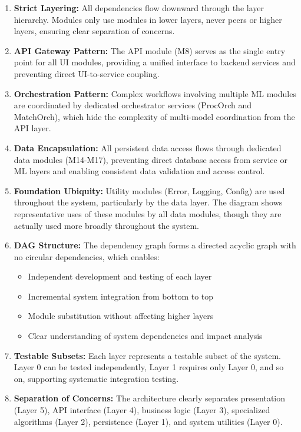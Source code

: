 \documentclass[12pt, titlepage]{article}
\begin{document}
\begin{enumerate}
\item \textbf{Strict Layering:} All dependencies flow downward through the layer hierarchy. Modules only use modules in lower layers, never peers or higher layers, ensuring clear separation of concerns.

\item \textbf{API Gateway Pattern:} The API module (M8) serves as the single entry point for all UI modules, providing a unified interface to backend services and preventing direct UI-to-service coupling.

\item \textbf{Orchestration Pattern:} Complex workflows involving multiple ML modules are coordinated by dedicated orchestrator services (ProcOrch and MatchOrch), which hide the complexity of multi-model coordination from the API layer.

\item \textbf{Data Encapsulation:} All persistent data access flows through dedicated data modules (M14-M17), preventing direct database access from service or ML layers and enabling consistent data validation and access control.

\item \textbf{Foundation Ubiquity:} Utility modules (Error, Logging, Config) are used throughout the system, particularly by the data layer. The diagram shows representative uses of these modules by all data modules, though they are actually used more broadly throughout the system.

\item \textbf{DAG Structure:} The dependency graph forms a directed acyclic graph with no circular dependencies, which enables:
  \begin{itemize}
  \item Independent development and testing of each layer
  \item Incremental system integration from bottom to top
  \item Module substitution without affecting higher layers
  \item Clear understanding of system dependencies and impact analysis
  \end{itemize}

\item \textbf{Testable Subsets:} Each layer represents a testable subset of the system. Layer 0 can be tested independently, Layer 1 requires only Layer 0, and so on, supporting systematic integration testing.

\item \textbf{Separation of Concerns:} The architecture clearly separates presentation (Layer 5), API interface (Layer 4), business logic (Layer 3), specialized algorithms (Layer 2), persistence (Layer 1), and system utilities (Layer 0).
\end{enumerate}
\end{document}
